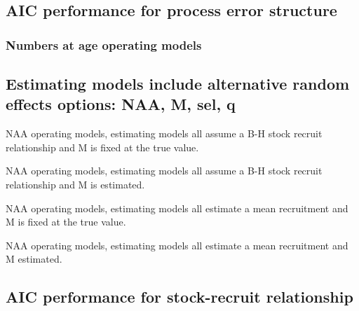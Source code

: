 \documentclass[
  12pt,
]{article}
\begin{document}
\hypertarget{aic-performance-for-process-error-structure}{%
\subsection{AIC performance for process error
structure}\label{aic-performance-for-process-error-structure}}

\clearpage

\hypertarget{numbers-at-age-operating-models}{%
\subsubsection{Numbers at age operating
models}\label{numbers-at-age-operating-models}}

\hypertarget{estimating-models-include-alternative-random-effects-options-naa-m-sel-q}{%
\subsection{Estimating models include alternative random effects
options: NAA, M, sel,
q}\label{estimating-models-include-alternative-random-effects-options-naa-m-sel-q}}

\clearpage

\begin{table}
\caption{NAA operating models, estimating models all assume a B-H stock recruit relationship and M is fixed at the true value.}
{}
\end{table}

\begin{table}
\caption{NAA operating models, estimating models all assume a B-H stock recruit relationship and M is estimated.}
{}
\end{table}

\begin{table}
\caption{NAA operating models, estimating models all estimate a mean recruitment and M is fixed at the true value.}
{}
\end{table}

\begin{table}
\caption{NAA operating models, estimating models all estimate a mean recruitment and M estimated.}
{}
\end{table}
\clearpage

\clearpage

\hypertarget{aic-performance-for-stock-recruit-relationship}{%
\subsection{AIC performance for stock-recruit
relationship}\label{aic-performance-for-stock-recruit-relationship}}
\end{document}
